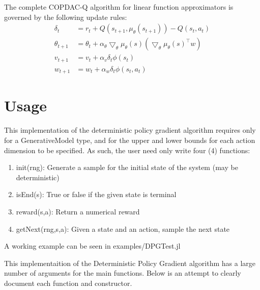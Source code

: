 \documentclass[a4paper]{article}
\begin{document}
The complete COPDAC-Q algorithm for linear function approximators is governed by the following update rules:
\begin{align}
\delta_t &= r_t + Q(s_{t+1},\mu_{\theta}(s_{t+1})) - Q(s_t,a_t)\\
\theta_{t+1} &= \theta_t + \alpha_{\theta}\bigtriangledown_{\theta}\mu_{\theta}(s)(\bigtriangledown_{\theta}\mu_{\theta}(s)^{\top}w)\\
v_{t+1} &= v_t + \alpha_v \delta_t \phi(s_t)\\
w_{t+1} &= w_t + \alpha_w \delta_t \phi(s_t,a_t)
\end{align}

\section{Usage}
This implementation of the deterministic policy gradient algorithm requires only for a GenerativeModel type, and for the upper and lower bounds for each action dimension to be specified. As such, the user need only write four (4) functions:
\begin{enumerate}
\item init(rng): Generate a sample for the initial state of the system (may be deterministic)
\item isEnd(s): True or false if the given state is terminal
\item reward(s,a): Return a numerical reward
\item getNext(rng,s,a): Given a state and an action, sample the next state
\end{enumerate}

A working example can be seen in examples/DPGTest.jl

This implementaition of the Deterministic Policy Gradient algorithm has a large number of arguments for the main functions. Below is an attempt to clearly document each function and constructor.
\end{document}
